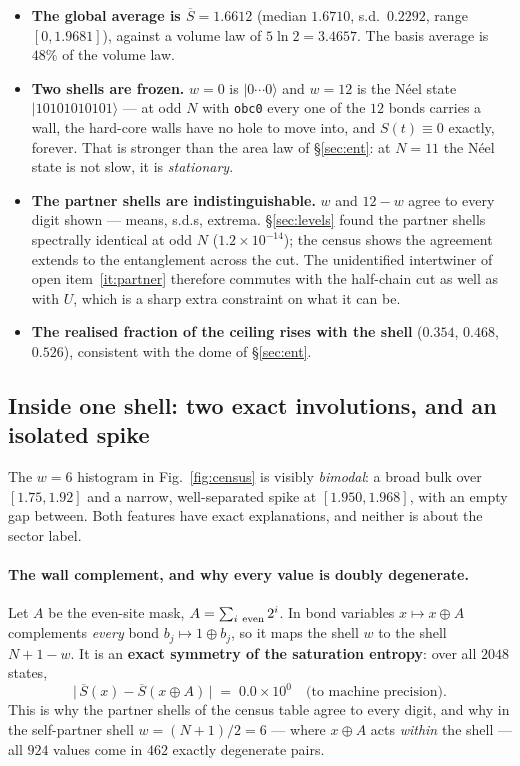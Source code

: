 \documentclass[11pt]{article}
\newcommand{\rt}[1]{\texttt{#1}}
\theoremstyle{plain}
\theoremstyle{definition}
\begin{document}
\begin{itemize}
\item \textbf{The global average is
  $\overline{S}=1.6612$} (median $1.6710$, s.d.\ $0.2292$, range
  $[0,1.9681]$), against a volume law of $5\ln2=3.4657$. The basis average is
  $48\%$ of the volume law.
\item \textbf{Two shells are frozen.} $w=0$ is $|0\cdots0\rangle$ and $w=12$ is
  the N\'eel state $|10101010101\rangle$ --- at odd $N$ with \rt{obc0} every one
  of the $12$ bonds carries a wall, the hard-core walls have no hole to move
  into, and $S(t)\equiv0$ exactly, forever. That is stronger than the area law
  of \S\ref{sec:ent}: at $N=11$ the N\'eel state is not slow, it is
  \emph{stationary}.
\item \textbf{The partner shells are indistinguishable.} $w$ and $12-w$ agree to
  every digit shown --- means, s.d.s, extrema. \S\ref{sec:levels} found the
  partner shells spectrally identical at odd $N$ ($1.2\times10^{-14}$); the
  census shows the agreement extends to the entanglement across the cut. The
  unidentified intertwiner of open item~\ref{it:partner} therefore commutes with
  the half-chain cut as well as with $U$, which is a sharp extra constraint on
  what it can be.
\item \textbf{The realised fraction of the ceiling rises with the shell}
  ($0.354$, $0.468$, $0.526$), consistent with the dome of \S\ref{sec:ent}.
\end{itemize}

\subsection{Inside one shell: two exact involutions, and an isolated spike}
\label{sec:spike}

The $w=6$ histogram in Fig.~\ref{fig:census} is visibly \emph{bimodal}: a broad
bulk over $[1.75,1.92]$ and a narrow, well-separated spike at $[1.950,1.968]$,
with an empty gap between. Both features have exact explanations, and neither is
about the sector label.

\paragraph{The wall complement, and why every value is doubly degenerate.}
Let $A$ be the even-site mask, $A=\sum_{i\ \rm even}2^i$. In bond variables
$x\mapsto x\oplus A$ complements \emph{every} bond $b_j\mapsto1\oplus b_j$, so it
maps the shell $w$ to the shell $N+1-w$. It is an \textbf{exact symmetry of the
saturation entropy}: over all $2048$ states,
\begin{equation}
\big|\,\overline{S}(x)-\overline{S}(x\oplus A)\,\big|
 \;=\;0.0\times10^{0}\quad\text{(to machine precision).}
\label{eq:compsym}
\end{equation}
This is why the partner shells of the census table agree to every digit, and why
in the self-partner shell $w=(N+1)/2=6$ --- where $x\oplus A$ acts \emph{within}
the shell --- all $924$ values come in $462$ exactly degenerate pairs.
\end{document}

